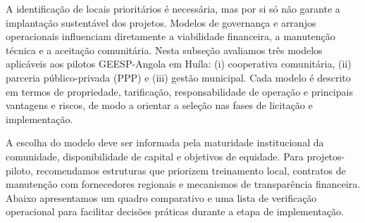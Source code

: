 \documentclass[12pt, a4paper]{article}
\begin{document}
A identificação de locais prioritários é necessária, mas por si só não garante a
implantação sustentável dos projetos. Modelos de governança e arranjos operacionais
influenciam diretamente a viabilidade financeira, a manutenção técnica e a aceitação
comunitária. Nesta subseção avaliamos três modelos aplicáveis aos pilotos GEESP-Angola
em Huíla: (i) cooperativa comunitária, (ii) parceria público-privada (PPP) e (iii)
gestão municipal. Cada modelo é descrito em termos de propriedade, tarificação,
responsabilidade de operação e principais vantagens e riscos, de modo a orientar a
seleção nas fases de licitação e implementação.

A escolha do modelo deve ser informada pela maturidade institucional da comunidade,
disponibilidade de capital e objetivos de equidade. Para projetos-piloto, recomendamos
estruturas que priorizem treinamento local, contratos de manutenção com fornecedores
regionais e mecanismos de transparência financeira. Abaixo apresentamos um quadro
comparativo e uma lista de verificação operacional para facilitar decisões práticas
durante a etapa de implementação.

\begin{table}[H]
\centering
\caption{Modelos de governança e sustentabilidade operacional para pilotos GEESP-Angola}
\label{tab:governance_models}

\small
{}
\end{table}
\end{document}

